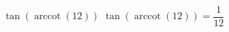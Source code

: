  {$\tan\left(\operatorname{arccot}\left( 12 \right)\right)$ }
{ $\tan\left(\operatorname{arccot}\left( 12  \right)\right) = \dfrac{1}{12}$ }
